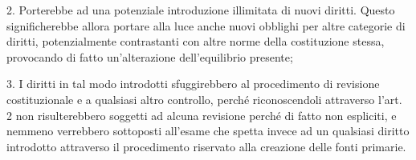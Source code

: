 2. Porterebbe ad una potenziale introduzione illimitata di nuovi diritti. Questo significherebbe allora portare alla luce anche nuovi obblighi per altre categorie di diritti, potenzialmente contrastanti con altre norme della costituzione stessa, provocando di fatto un'alterazione dell'equilibrio presente;

3. I diritti in tal modo introdotti sfuggirebbero al procedimento di revisione costituzionale e a qualsiasi altro controllo, perché riconoscendoli attraverso l'art. 2 non risulterebbero soggetti ad alcuna revisione perché di fatto non espliciti, e nemmeno verrebbero sottoposti all'esame che spetta invece ad un qualsiasi diritto introdotto attraverso il procedimento riservato alla creazione delle fonti primarie.
